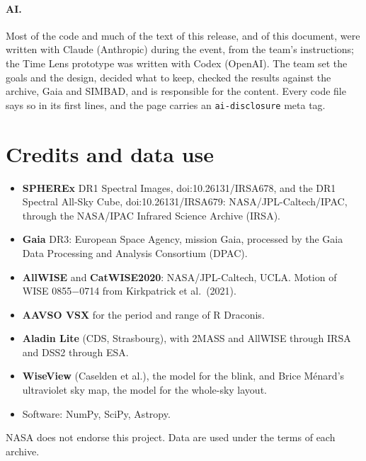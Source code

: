 \documentclass[11pt,a4paper]{article}
\begin{document}
\paragraph{AI.} Most of the code and much of the text of this release, and of this document,
were written with Claude (Anthropic) during the event, from the team's instructions; the Time Lens
prototype was written with Codex (OpenAI). The team set the goals and the design, decided what to
keep, checked the results against the archive, Gaia and SIMBAD, and is responsible for the content.
Every code file says so in its first lines, and the page carries an \texttt{ai-disclosure} meta tag.

\section{Credits and data use}

\begin{itemize}
  \item \textbf{SPHEREx} DR1 Spectral Images, doi:10.26131/IRSA678, and the DR1 Spectral All-Sky
        Cube, doi:10.26131/IRSA679: NASA/JPL-Caltech/IPAC, through the NASA/IPAC Infrared Science
        Archive (IRSA).
  \item \textbf{Gaia} DR3: European Space Agency, mission Gaia, processed by the Gaia Data
        Processing and Analysis Consortium (DPAC).
  \item \textbf{AllWISE} and \textbf{CatWISE2020}: NASA/JPL-Caltech, UCLA. Motion of
        WISE 0855$-$0714 from Kirkpatrick et al.\ (2021).
  \item \textbf{AAVSO VSX} for the period and range of R Draconis.
  \item \textbf{Aladin Lite} (CDS, Strasbourg), with 2MASS and AllWISE through IRSA and DSS2
        through ESA.
  \item \textbf{WiseView} (Caselden et al.), the model for the blink, and Brice M\'enard's
        ultraviolet sky map, the model for the whole-sky layout.
  \item Software: NumPy, SciPy, Astropy.
\end{itemize}
NASA does not endorse this project. Data are used under the terms of each archive.

\sloppy
\end{document}
